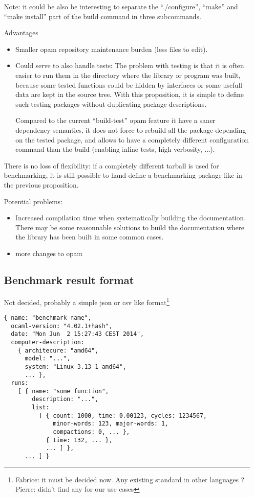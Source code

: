 \documentclass[11pt,a4paper]{article}
\begin{document}
Note: it could be also be interesting to separate the ``./configure'',
``make'' and ``make install'' part of the build command in three
subcommands.

Advantages
\begin{itemize}
\item Smaller opam repository maintenance burden (less files to edit).
\item Could serve to also handle tests: The problem with testing is
  that it is often easier to run them in the directory where the
  library or program was built, because some tested functions could be
  hidden by interfaces or some usefull data are kept in the source
  tree. With this proposition, it is simple to define such testing
  packages without duplicating package descriptions.

  Compared to the current ``build-test'' opam feature it have a saner
  dependency semantics, it does not force to rebuild all the package
  depending on the tested package, and allows to have a completely
  different configuration command than the build (enabling inline
  tests, high verbosity, ...).
\end{itemize}

There is no loss of flexibility: if a completely different tarball is
used for benchmarking, it is still possible to hand-define a
benchmarking package like in the previous proposition.

Potential problems:
\begin{itemize}
\item Increased compilation time when systematically building the
  documentation. There may be some reasonnable solutions to build the
  documentation where the library has been built in some common cases.
\item more changes to opam
\end{itemize}

\subsection{Benchmark result format}

Not decided, probably a simple json or csv like
format\footnote{Fabrice: it must be decided now. Any existing standard
  in other languages ?\\
  Pierre: didn't find any for our use cases }

\begin{verbatim}
{ name: "benchmark name",
  ocaml-version: "4.02.1+hash",
  date: "Mon Jun  2 15:27:43 CEST 2014",
  computer-description:
    { architecure: "amd64",
      model: "...",
      system: "Linux 3.13-1-amd64",
      ... },
  runs:
    [ { name: "some function",
        description: "...",
        list:
          [ { count: 1000, time: 0.00123, cycles: 1234567,
              minor-words: 123, major-words: 1,
              compactions: 0, ... },
            { time: 132, ... },
            ... ] },
      ... ] }
\end{verbatim}
\end{document}
